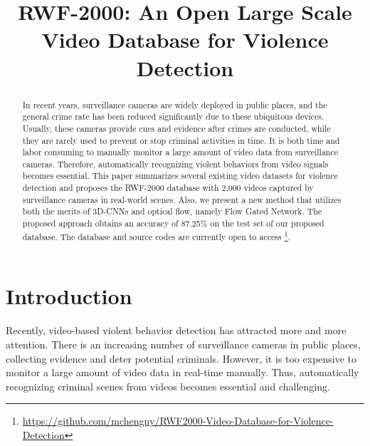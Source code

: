 \documentclass[a4paper,conference]{IEEEtran}
\begin{document}
\title{RWF-2000: An Open Large Scale Video Database for Violence Detection}
\author{
\and
{}
\and
{}
}

\maketitle


\begin{abstract}
In recent years, surveillance cameras are widely deployed in public places, and the general crime rate has been reduced significantly due to these ubiquitous devices. Usually, these cameras provide cues and evidence after crimes are conducted, while they are rarely used to prevent or stop criminal activities in time. It is both time and labor consuming to manually monitor a large amount of video data from surveillance cameras. Therefore, automatically recognizing violent behaviors from video signals becomes essential. This paper summarizes several existing video datasets for violence detection and proposes the RWF-2000 database with 2,000 videos captured by surveillance cameras in real-world scenes. Also, we present a new method that utilizes both the merits of 3D-CNNs and optical flow, namely Flow Gated Network. The proposed approach obtains an accuracy of 87.25\% on the test set of our proposed database. The database and source codes are currently open to access \footnote{\url{https://github.com/mchengny/RWF2000-Video-Database-for-Violence-Detection}}.
\end{abstract}

\IEEEpeerreviewmaketitle

\section{Introduction}
Recently, video-based violent behavior detection has attracted more and more attention. There is an increasing number of surveillance cameras in public places, collecting evidence and deter potential criminals. However, it is too expensive to monitor a large amount of video data in real-time manually. Thus, automatically recognizing criminal scenes from videos becomes essential and challenging.
\end{document}
